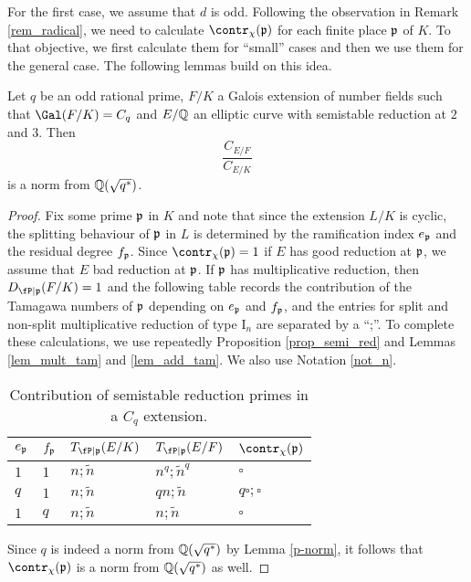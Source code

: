 For the first case, we assume that $d$ is odd. Following the observation in Remark \ref{rem_radical}, we need to calculate $\contr_\chi(\pp)$ for each finite place $\mathfrak{p}$ of $K$. To that objective, we first calculate them for ``small'' cases and then we use them for the general case. The following lemmas build on this idea.

\begin{lemma}\label{lem_Cp}
    Let $q$ be an odd rational prime, $F/K$ a Galois extension of number fields such that $\Gal(F/K)=C_q$ and $E/\mathbb{Q}$ an elliptic curve with semistable reduction at $2$ and $3$. Then 
    $$\frac{C_{E/F}}{C_{E/K}}$$
    is a norm from $\mathbb{Q}(\sqrt{q^*})$.
\end{lemma}

\begin{proof}
    Fix some prime $\mathfrak{p}$ in $K$ and note that since the extension $L/K$ is cyclic, the splitting behaviour of $\mathfrak{p}$ in $L$ is determined by the ramification index $e_{\mathfrak{p}}$ and the residual degree $f_{\mathfrak{p}}$. Since $\contr_\chi(\pp)=1$ if $E$ has good reduction at $\mathfrak{p}$, we assume that $E$ bad reduction at $\mathfrak{p}$. If $\mathfrak{p}$ has multiplicative reduction, then $D_{\fP\mid\pp}(F/K)=1$ and the following table records the contribution of the Tamagawa numbers of $\mathfrak{p}$ depending on $e_{\mathfrak{p}}$ and $f_{\mathfrak{p}}$, and the entries for split and non-split multiplicative reduction of type $\mathrm{I}_n$ are separated by a ``;''. To complete these calculations, we use repeatedly Proposition \ref{prop_semi_red} and Lemmas \ref{lem_mult_tam} and \ref{lem_add_tam}. We also use Notation \ref{not_n}.

    \begin{table}[!ht]\label{table_Cp}
        \centering
        \begin{tabular}{|l|l|l|l|l|}
        \hline
        $e_{\mathfrak{p}}$ & $f_{\mathfrak{p}}$  & $T_{\fP\mid \pp}(E/K)$ & $T_{\fP\mid \pp}(E/F)$  & $\contr_\chi(\pp)$ \\ \hline
        $1$ & $1$ & $n;\tilde{n}$ & $n^q;\tilde{n}^q$ & $\square$ \\ \hline
        $q$ & $1$ & $n;\tilde{n}$ & $qn;\tilde{n}$ & $q\square;\square$ \\ \hline
        $1$ & $q$ & $n;\tilde{n}$ & $n;\tilde{n}$ & $\square$ \\ \hline
        \end{tabular}
        \caption{Contribution of semistable reduction primes in a $C_q$ extension.}
    \end{table}

    Since $q$ is indeed a norm from $\mathbb{Q}(\sqrt{q^*})$ by Lemma \ref{p-norm}, it follows that $\contr_\chi(\pp)$ is a norm from $\mathbb{Q}(\sqrt{q^*})$ as well.


\end{proof}
